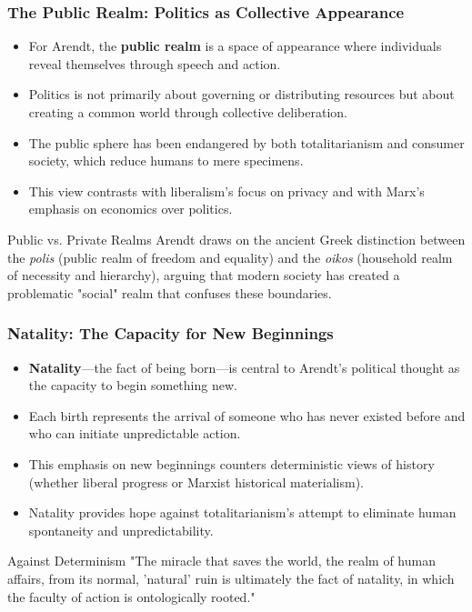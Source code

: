 \documentclass{beamer}
\begin{document}
\begin{frame}
\frametitle{The Public Realm: Politics as Collective Appearance}
\begin{itemize}
    \item For Arendt, the \textbf{public realm} is a space of appearance where individuals reveal themselves through speech and action.
    \item Politics is not primarily about governing or distributing resources but about creating a common world through collective deliberation.
    \item The public sphere has been endangered by both totalitarianism and consumer society, which reduce humans to mere specimens.
    \item This view contrasts with liberalism's focus on privacy and with Marx's emphasis on economics over politics.
\end{itemize}

\begin{block}{Public vs. Private Realms}
Arendt draws on the ancient Greek distinction between the \textit{polis} (public realm of freedom and equality) and the \textit{oikos} (household realm of necessity and hierarchy), arguing that modern society has created a problematic "social" realm that confuses these boundaries.
\end{block}
\end{frame}

\begin{frame}
\frametitle{Natality: The Capacity for New Beginnings}
\begin{itemize}
    \item \textbf{Natality}—the fact of being born—is central to Arendt's political thought as the capacity to begin something new.
    \item Each birth represents the arrival of someone who has never existed before and who can initiate unpredictable action.
    \item This emphasis on new beginnings counters deterministic views of history (whether liberal progress or Marxist historical materialism).
    \item Natality provides hope against totalitarianism's attempt to eliminate human spontaneity and unpredictability.
\end{itemize}

\begin{alertblock}{Against Determinism}
"The miracle that saves the world, the realm of human affairs, from its normal, 'natural' ruin is ultimately the fact of natality, in which the faculty of action is ontologically rooted."
\end{alertblock}
\end{frame}
\end{document}

